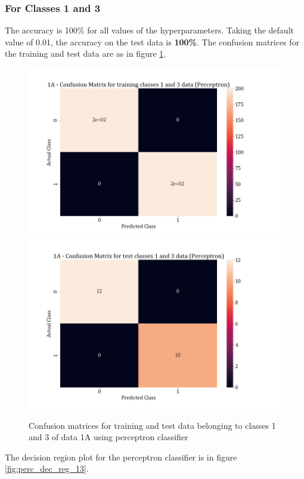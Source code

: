 \documentclass[11pt,a4paper]{article}
\begin{document}
\subsubsection{For Classes 1 and 3}

The accuracy is 100\% for all values of the hyperparameters. Taking the default value of 0.01, the accuracy on the test data is \textbf{100\%}. The confusion matrices for the training and test data are as in figure \ref{fig:perc_conf_13}.
\begin{figure}[H]
    \centering
    \includegraphics[scale=0.27]{images/perceptron_training classes 1 and 3_confmat.png}
    \includegraphics[scale = 0.27]{images/perceptron_test classes 1 and 3_confmat.png}
    \caption{Confusion matrices for training and test data belonging to classes 1 and 3 of data 1A using perceptron classifier}
    \label{fig:perc_conf_13}
\end{figure}
The decision region plot for the perceptron classifier is in figure \ref{fig:perc_dec_reg_13}.
\end{document}
